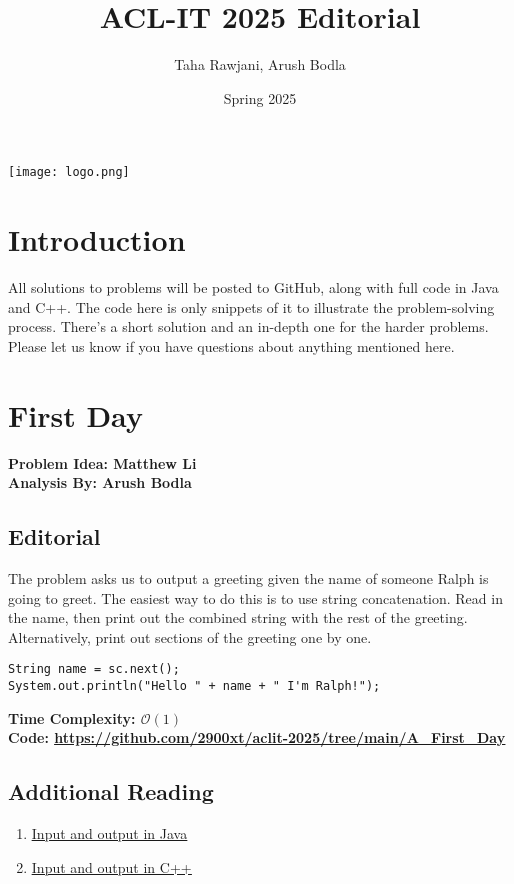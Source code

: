 \documentclass{article}
\title{ACL-IT 2025 Editorial}
\author{Taha Rawjani, Arush Bodla} %
\date{Spring 2025}
\newcommand{\link}[1]{\textcolor{blue!50!black}{\uline{\url{#1}}}}
\newcommand{\namelink}[2]{\textcolor{blue!50!black}{\uline{\href{#1}{#2}}}}
\begin{document}
\maketitle
\begin{center}
	\vfill
	\texttt{[image: logo.png]}
	\vfill
\end{center}

\newpage

\tableofcontents

\newpage

\section*{Introduction}
All solutions to problems will be posted to GitHub, along with full code in Java and C++. The code here is only snippets of it to illustrate the problem-solving process. There's a short solution and an in-depth one for the harder problems. Please let us know if you have questions about anything mentioned here.
\newpage
\section{First Day}
\textbf{Problem Idea: Matthew Li\\ Analysis By: Arush Bodla}
\subsection{Editorial}
The problem asks us to output a greeting given the name of someone Ralph is going to greet. The easiest way to do this is to use string concatenation. Read in the name, then print out the combined string with the rest of the greeting. Alternatively, print out sections of the greeting one by one.
\begin{lstlisting}
String name = sc.next();
System.out.println("Hello " + name + " I'm Ralph!");
\end{lstlisting}
\textbf{Time Complexity: $\mathcal{O}(1)$}\\
\textbf{Code: \link{https://github.com/2900xt/aclit-2025/tree/main/A_First_Day}}
\subsection{Additional Reading}
\begin{enumerate}
    \item \namelink{https://www.programiz.com/java-programming/basic-input-output}{Input and output in Java}
    \item \namelink{https://www.geeksforgeeks.org/basic-input-output-c/}{Input and output in C++}
\end{enumerate}
\newpage
\end{document}

